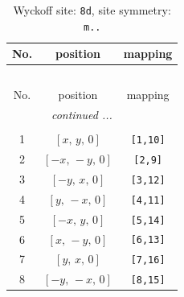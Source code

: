 \documentclass[fleqn,8pt]{jsarticle}
\begin{document}
\renewcommand{\arraystretch}{1.2}
\begin{longtable}{ccc}
\caption{Wyckoff site: {\tt 8d}, site symmetry: {\tt m..}}
 \\
 \hline \hline
No. & position & mapping \\ \hline \endfirsthead

\multicolumn{2}{l}{\tablename\ \thetable{}} \\
 \hline \hline
No. & position & mapping \\ \hline \endhead

 \hline \hline
\multicolumn{2}{r}{\footnotesize\it continued ...} \\ \endfoot

 \hline \hline
\multicolumn{2}{r}{} \\ \endlastfoot

1 & $\left[ x,\, y,\, 0 \right]$ & {\tt [1,10]} \\ \hline
2 & $\left[ - x,\, - y,\, 0 \right]$ & {\tt [2,9]} \\ \hline
3 & $\left[ - y,\, x,\, 0 \right]$ & {\tt [3,12]} \\ \hline
4 & $\left[ y,\, - x,\, 0 \right]$ & {\tt [4,11]} \\ \hline
5 & $\left[ - x,\, y,\, 0 \right]$ & {\tt [5,14]} \\ \hline
6 & $\left[ x,\, - y,\, 0 \right]$ & {\tt [6,13]} \\ \hline
7 & $\left[ y,\, x,\, 0 \right]$ & {\tt [7,16]} \\ \hline
8 & $\left[ - y,\, - x,\, 0 \right]$ & {\tt [8,15]} \\
\end{longtable}
\renewcommand{\arraystretch}{1.2}
\end{document}
